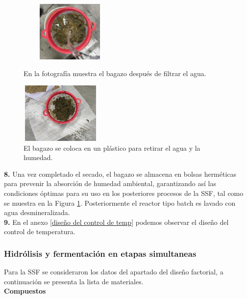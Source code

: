 \documentclass[12pt]{article}
\begin{document}
	
		\begin{figure}[H]
		\centering
		\begin{minipage}{0.46\textwidth}
			\centering
			\includegraphics[width=5cm, height=3cm]{imagenes/enjuagado} %
			\caption{En la fotografía muestra el bagazo después de filtrar el agua.}
			\label{enjuagado}
		\end{minipage}
		\hfill
		\begin{minipage}{0.48\textwidth}
			\centering
			\includegraphics[width=4cm, height=3cm]{imagenes/secado6} %
			\caption{El bagazo se coloca en un plástico para retirar el agua y la humedad.}
			\label{biologico4}
		\end{minipage}
	\end{figure}
	
	
	
	
	
	 \textbf{8.} Una vez completado el secado, el bagazo se almacena en bolsas herméticas para prevenir la absorción de humedad ambiental, garantizando así las condiciones óptimas para su uso en los posteriores procesos de la SSF, tal como se muestra en la Figura \ref{biologico4}. Posteriormente el reactor tipo batch es lavado con agua desmineralizada. \\[0.5em]
	
	\textbf{9.} En el anexo \ref{diseño del control de temp} podemos observar el diseño del control de temperatura.
	

			
				\subsubsection{Hidrólisis y fermentación en etapas simultaneas}
				
			Para la SSF se consideraron los datos del apartado del diseño factorial, a continuación se presenta la lista de materiales.
			\\
					 \textbf{Compuestos} \\[0.5em]
					 
\end{document}
